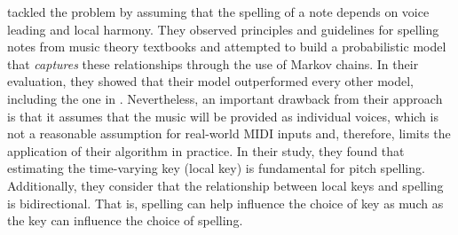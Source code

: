 \textcite{teodoru2007pitch} tackled the problem by assuming
that the spelling of a note depends on voice leading and
local harmony. They observed principles and guidelines for
spelling notes from music theory textbooks
\parencite{aldwell2017harmony, rimskykorsakov2005practical}
and attempted to build a probabilistic model that
\emph{captures} these relationships through the use of
Markov chains. In their evaluation, they showed that their
model outperformed every other model, including the one in
\textcite{meredith_ps13_2006}. Nevertheless, an important
drawback from their approach is that it assumes that the
music will be provided as individual voices, which is not a
reasonable assumption for real-world MIDI inputs and,
therefore, limits the application of their algorithm in
practice. In their study, they found that estimating the
time-varying key (local key) is fundamental for pitch
spelling. Additionally, they consider that the relationship
between local keys and spelling is bidirectional. That is,
spelling can help influence the choice of key as much as the
key can influence the choice of spelling.
